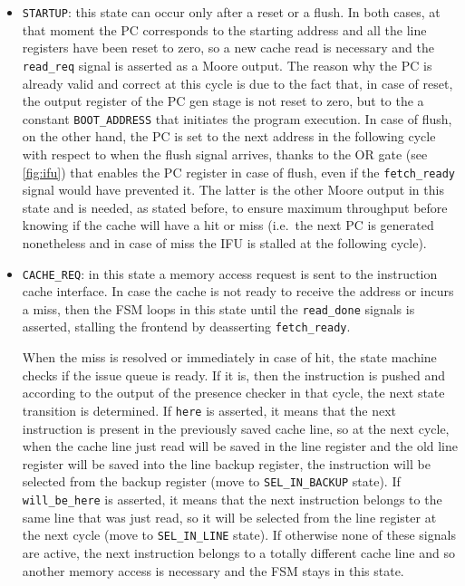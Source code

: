 \begin{itemize}
  \item \texttt{STARTUP}: this state can occur only after a reset or a flush. In both cases, at that moment the \ac{PC} corresponds to the starting address and all the line registers have been reset to zero, so a new cache read is necessary and the \texttt{read\_req} signal is asserted as a Moore output. The reason why the \ac{PC} is already valid and correct at this cycle is due to the fact that, in case of reset, the output register of the \ac{PC} gen stage is not reset to zero, but to the a constant \texttt{BOOT\_ADDRESS} that initiates the program execution. In case of flush, on the other hand, the \ac{PC} is set to the next address in the following cycle with respect to when the flush signal arrives, thanks to the OR gate (see \cref{fig:ifu}) that enables the \ac{PC} register in case of flush, even if the \texttt{fetch\_ready} signal would have prevented it. The latter is the other Moore output in this state and is needed, as stated before, to ensure maximum throughput before knowing if the cache will have a hit or miss (i.e.\ the next \ac{PC} is generated nonetheless and in case of miss the \ac{IFU} is stalled at the following cycle).
  \item \texttt{CACHE\_REQ}: in this state a memory access request is sent to the instruction cache interface. In case the cache is not ready to receive the address or incurs a miss, then the \acs{FSM} loops in this state until the \texttt{read\_done} signals is asserted, stalling the frontend by deasserting \texttt{fetch\_ready}. 
  
  When the miss is resolved or immediately in case of hit, the state machine checks if the issue queue is ready. If it is, then the instruction is pushed and according to the output of the presence checker in that cycle, the next state transition is determined. If \texttt{here} is asserted, it means that the next instruction is present in the previously saved cache line, so at the next cycle, when the cache line just read will be saved in the line register and the old line register will be saved into the line backup register, the instruction will be selected from the backup register (move to \texttt{SEL\_IN\_BACKUP} state). If \texttt{will\_be\_here} is asserted, it means that the next instruction belongs to the same line that was just read, so it will be selected from the line register at the next cycle (move to \texttt{SEL\_IN\_LINE} state). If otherwise none of these signals are active, the next instruction belongs to a totally different cache line and so another memory access is necessary and the \acs{FSM} stays in this state.


\end{itemize}
